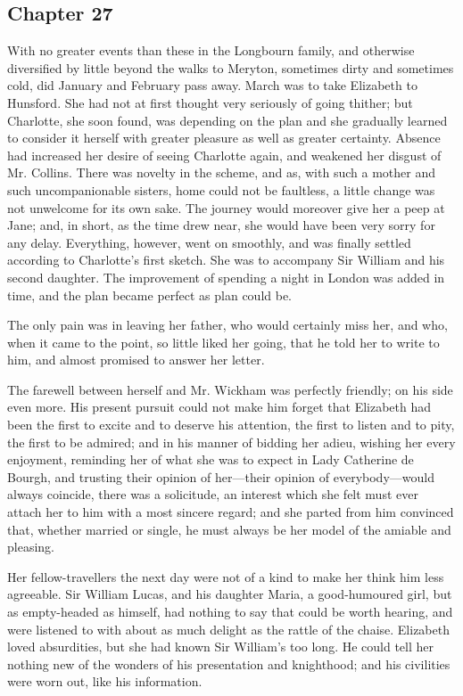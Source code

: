 \subsection[chapter-27]{\useURL[url27][][][]\from[url27] Chapter 27}

With no greater events than these in the Longbourn family, and otherwise diversified by little beyond the walks to Meryton, sometimes dirty and sometimes cold, did January and February pass away. March was to take Elizabeth to Hunsford. She had not at first thought very seriously of going thither; but Charlotte, she soon found, was depending on the plan and she gradually learned to consider it herself with greater pleasure as well as greater certainty. Absence had increased her desire of seeing Charlotte again, and weakened her disgust of Mr. Collins. There was novelty in the scheme, and as, with such a mother and such uncompanionable sisters, home could not be faultless, a little change was not unwelcome for its own sake. The journey would moreover give her a peep at Jane; and, in short, as the time drew near, she would have been very sorry for any delay. Everything, however, went on smoothly, and was finally settled according to Charlotte's first sketch. She was to accompany Sir William and his second daughter. The improvement of spending a night in London was added in time, and the plan became perfect as plan could be.

The only pain was in leaving her father, who would certainly miss her, and who, when it came to the point, so little liked her going, that he told her to write to him, and almost promised to answer her letter.

The farewell between herself and Mr. Wickham was perfectly friendly; on his side even more. His present pursuit could not make him forget that Elizabeth had been the first to excite and to deserve his attention, the first to listen and to pity, the first to be admired; and in his manner of bidding her adieu, wishing her every enjoyment, reminding her of what she was to expect in Lady Catherine de Bourgh, and trusting their opinion of her---their opinion of everybody---would always coincide, there was a solicitude, an interest which she felt must ever attach her to him with a most sincere regard; and she parted from him convinced that, whether married or single, he must always be her model of the amiable and pleasing.

Her fellow-travellers the next day were not of a kind to make her think him less agreeable. Sir William Lucas, and his daughter Maria, a good-humoured girl, but as empty-headed as himself, had nothing to say that could be worth hearing, and were listened to with about as much delight as the rattle of the chaise. Elizabeth loved absurdities, but she had known Sir William's too long. He could tell her nothing new of the wonders of his presentation and knighthood; and his civilities were worn out, like his information.


